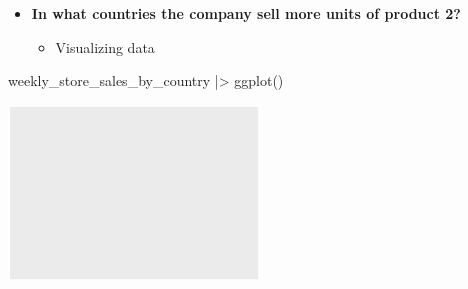 \documentclass[
  ignorenonframetext,
]{beamer}
\newenvironment{Shaded}{\begin{snugshade}}{\end{snugshade}}
\newcommand{\FunctionTok}[1]{\textcolor[rgb]{0.28,0.35,0.67}{#1}}
\newcommand{\NormalTok}[1]{\textcolor[rgb]{0.00,0.23,0.31}{#1}}
\newcommand{\SpecialCharTok}[1]{\textcolor[rgb]{0.37,0.37,0.37}{#1}}
\providecommand{\tightlist}{%
  \setlength{\itemsep}{0pt}\setlength{\parskip}{0pt}}\usepackage{longtable,booktabs,array}
\begin{document}
\begin{frame}[fragile]{}
\label{section-31}
\begin{itemize}
\item
  \textbf{In what countries the company sell more units of product 2?}

  \begin{itemize}
  \tightlist
  \item
    Visualizing data
  \end{itemize}
\end{itemize}

\tiny

\begin{Shaded}
\begin{Highlighting}[]
\NormalTok{weekly\_store\_sales\_by\_country }\SpecialCharTok{|\textgreater{}} \FunctionTok{ggplot}\NormalTok{()}
\end{Highlighting}
\end{Shaded}

\begin{center}
\includegraphics[width=0.5\textwidth,height=\textheight]{003_describing_data_files/figure-beamer/unnamed-chunk-30-1.pdf}
\end{center}
\end{frame}
\end{document}
